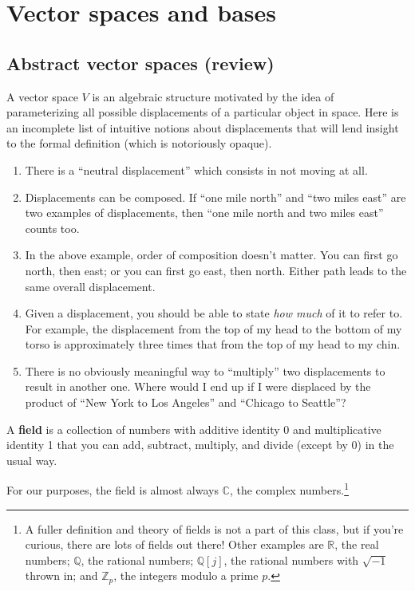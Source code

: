 \chapter{Vector spaces and bases}

\section{Abstract vector spaces (review)}
A vector space \(V\) is an algebraic structure motivated by the idea of parameterizing all possible displacements of a particular object in space.
Here is an incomplete list of intuitive notions about displacements that will lend insight to the formal definition (which is notoriously opaque).
\begin{enumerate}
  \item
  There is a ``neutral displacement'' which consists in not moving at all.
  \item
  Displacements can be composed.
  If ``one mile north'' and ``two miles east'' are two examples of displacements, then ``one mile north and two miles east'' counts too.
  \item
  In the above example, order of composition doesn't matter.
  You can first go north, then east; or you can first go east, then north.
  Either path leads to the same overall displacement.
  \item
  Given a displacement, you should be able to state \emph{how much} of it to refer to.
  For example, the displacement from the top of my head to the bottom of my torso is approximately three times that from the top of my head to my chin.
  \item
  There is no obviously meaningful way to ``{multiply}'' two displacements to result in another one.
  Where would I end up if I were displaced by the product of ``New York to Los Angeles'' and ``Chicago to Seattle''?
\end{enumerate}

\begin{infdef}
  A \textbf{field} is a collection of numbers with additive identity 0 and multiplicative identity 1 that you can add, subtract, multiply, and divide (except by 0) in the usual way.
\end{infdef}
For our purposes, the field is almost always \(\mathbb{C}\), the complex numbers.\footnote{A fuller definition and theory of fields is not a part of this class, but if you're curious, there are lots of fields out there! Other examples are \(\mathbb{R}\), the real numbers; \(\mathbb{Q}\), the rational numbers; \(\mathbb{Q}[j]\), the rational numbers with \(\sqrt{-1}\) thrown in; and \(\mathbb{Z}_p\), the integers modulo a prime \(p\).}

